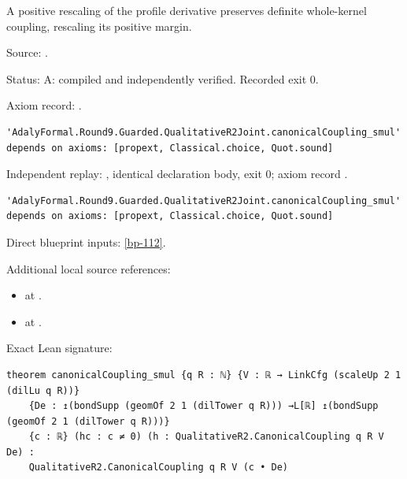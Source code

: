 \begin{theorem}[bp-308]
\label{bp-308}
\leanok
A positive rescaling of the profile derivative preserves definite whole-kernel coupling, rescaling its positive margin.

\par Source: \texttt{}.
\par Status: A: compiled and independently verified. Recorded exit 0.
\par Axiom record: \texttt{}.
\begin{verbatim}
'AdalyFormal.Round9.Guarded.QualitativeR2Joint.canonicalCoupling_smul' depends on axioms: [propext, Classical.choice, Quot.sound]
\end{verbatim}
\par Independent replay: \texttt{}, identical declaration body, exit 0; axiom record \texttt{}.
\begin{verbatim}
'AdalyFormal.Round9.Guarded.QualitativeR2Joint.canonicalCoupling_smul' depends on axioms: [propext, Classical.choice, Quot.sound]
\end{verbatim}
\par Direct blueprint inputs: \ref{bp-112}.
\par Additional local source references:
\begin{itemize}
\item \texttt{} at \texttt{}.
\item \texttt{} at \texttt{}.
\end{itemize}
\par Exact Lean signature:
\begin{verbatim}
theorem canonicalCoupling_smul {q R : ℕ} {V : ℝ → LinkCfg (scaleUp 2 1 (dilLu q R))}
    {De : ↥(bondSupp (geomOf 2 1 (dilTower q R))) →L[ℝ] ↥(bondSupp (geomOf 2 1 (dilTower q R)))}
    {c : ℝ} (hc : c ≠ 0) (h : QualitativeR2.CanonicalCoupling q R V De) :
    QualitativeR2.CanonicalCoupling q R V (c • De)
\end{verbatim}
\end{theorem}

